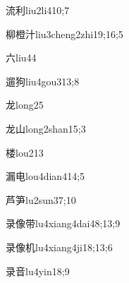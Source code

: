 \begin{verbete}{流利}{liu2li4}{10;7}
\end{verbete}

\begin{verbete}{柳橙汁}{liu3cheng2zhi1}{9;16;5}
\end{verbete}

\begin{verbete}{六}{liu4}{4}
\end{verbete}

\begin{verbete}{遛狗}{liu4gou3}{13;8}
\end{verbete}

\begin{verbete}{龙}{long2}{5}
\end{verbete}

\begin{verbete}{龙山}{long2shan1}{5;3}
\end{verbete}

\begin{verbete}{楼}{lou2}{13}
\end{verbete}

\begin{verbete}{漏电}{lou4dian4}{14;5}
\end{verbete}

\begin{verbete}{芦笋}{lu2sun3}{7;10}
\end{verbete}

\begin{verbete}{录像带}{lu4xiang4dai4}{8;13;9}
\end{verbete}

\begin{verbete}{录像机}{lu4xiang4ji1}{8;13;6}
\end{verbete}

\begin{verbete}{录音}{lu4yin1}{8;9}
\end{verbete}

